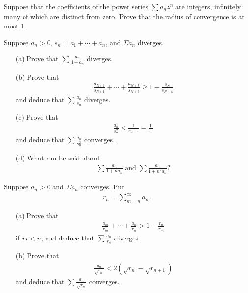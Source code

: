   \begin{exercise}[Rudin 3.10]
    Suppose that the coefficients of the power series $\sum a_n z^n$ are integers, infinitely many of which are distinct from zero. Prove that the radius of convergence is at most 1.
  \end{exercise}
  \begin{solution}
    
  \end{solution}

  \begin{exercise}[Rudin 3.11]
    Suppose $a_n > 0$, $s_n = a_1 + \cdots + a_n$, and $\Sigma a_n$ diverges.
    \begin{enumerate} 
      \item[(a)] Prove that $\sum \frac{a_n}{1+a_n}$ diverges.
      \item[(b)] Prove that
      \begin{align*}
        \frac{a_{N+1}}{s_{N+1}} + \cdots + \frac{a_{N+k}}{s_{N+k}} \geq 1 - \frac{s_N}{s_{N+k}}
      \end{align*}
      and deduce that $\sum \frac{a_n}{s_n}$ diverges.
      \item[(c)] Prove that
      \begin{align*}
        \frac{a_n}{s_n^2} \leq \frac{1}{s_{n-1}} - \frac{1}{s_n}
      \end{align*}
      and deduce that $\sum \frac{a_n}{s_n^2}$ converges.
      \item[(d)] What can be said about
      \begin{align*}
        \sum \frac{a_n}{1+na_n} \text{ and } \sum \frac{a_n}{1+n^2a_n}?
      \end{align*}
    \end{enumerate}
  \end{exercise}
  \begin{solution}
    
  \end{solution}

  \begin{exercise}[Rudin 3.12]
    Suppose $a_n > 0$ and $\Sigma a_n$ converges. Put
    \begin{align*}
      r_n = \sum_{m=n}^{\infty} a_m.
    \end{align*}
    \begin{enumerate} 
      \item[(a)] Prove that
      \begin{align*}
        \frac{a_m}{r_m} + \cdots + \frac{a_n}{r_n} > 1 - \frac{r_n}{r_m}
      \end{align*}
      if $m < n$, and deduce that $\sum \frac{a_n}{r_n}$ diverges.
      \item[(b)] Prove that
      \begin{align*}
        \frac{a_n}{\sqrt{r_n}} < 2(\sqrt{r_n} - \sqrt{r_{n+1}})
      \end{align*}
      and deduce that $\sum \frac{a_n}{\sqrt{r_n}}$ converges.
    \end{enumerate}
  \end{exercise}
  \begin{solution}
    
  \end{solution}

